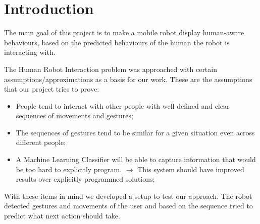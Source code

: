 
\section{Introduction}
The main goal of this project is to make a mobile robot display human-aware behaviours, based on the predicted behaviours of the human the robot is interacting with. 



The Human Robot Interaction problem was approached with certain assumptions/approximations as a basis for our work. These are the assumptions that our project tries to prove: 

\begin{itemize}
\item People tend to interact with other people with well defined and clear sequences of movements and gestures;
\item The sequences of gestures tend to be similar for a given situation even across different people;
\item A Machine Learning Classifier will be able to capture information that would be too hard to explicitly program. $\rightarrow$ This system should have improved results over explicitly programmed solutions;
\end{itemize}

With these items in mind we developed a setup to test our approach. The robot detected gestures and movements of the user and based on the sequence tried to predict what next action should take.








